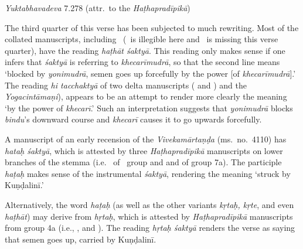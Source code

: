 \begin{ekdosis}
\begin{testimonia}[hp03_040]
\emph{Yuktabhavadeva} 7.278 (attr.~to the \emph{Haṭhapradīpikā})
\begin{versinnote}
\end{versinnote}
\end{testimonia}

\begin{philcomm}[hp03_040]

The third quarter of this verse has been subjected to much rewriting. Most of the collated manuscripts, including \alphaTwo\ (\alphaOne\ is illegible here and \alphaThree\ is missing this verse quarter), have the reading \emph{haṭhāt śaktyā}. This reading only makes sense if one infers that \emph{śaktyā} is referring to \emph{khecarīmudrā}, so that the second line means `blocked by \emph{yonimudrā}, semen goes up forcefully by the power [of \emph{khecarīmudrā}].' The reading \emph{hi tacchaktyā} of two delta manuscripts ( and ) and the \emph{Yogacintāmaṇi}), appears to be an attempt to render more clearly the meaning `by the power of \emph{khecarī}.' Such an interpretation suggests that \emph{yonimudrā} blocks \emph{bindu}'s downward course and \emph{khecarī} causes it to go upwards forcefully.

A manuscript of an early recension of the \emph{Vivekamārtaṇḍa} (ms.~no.~4110) has \emph{hataḥ śaktyā}, which is attested by three \emph{Haṭhapradīpikā} manuscripts on lower branches of the stemma (i.e.~ of \textdelta\ group and  and  of group 7a). The participle \emph{haṭaḥ} makes sense of the instrumental \emph{śaktyā}, rendering the meaning `struck by Kuṇḍalinī.' 

Alternatively, the word \emph{haṭaḥ} (as well as the other variants \emph{kṛtaḥ, kṛte}, and even \emph{haṭhāt}) may derive from \emph{hṛtaḥ}, which is attested by \emph{Haṭhapradīpikā} manuscripts from group 4a (i.e., ,  and ). The reading \emph{hṛtaḥ śaktyā} renders the verse as saying that semen goes up, carried by Kuṇḍalinī. 






\end{philcomm}
\end{ekdosis}
